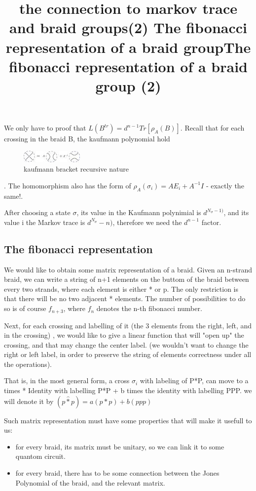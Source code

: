 \documentclass{article}
\begin{document}
{We only have to proof that \(L(B^{tr}) = d^{n-1}Tr[\rho_{A}(B)]\). Recall that for each crossing in the braid B, the kaufmann polynomial hold \begin{figure}
\includegraphics[scale=1]{kaufmann_bracket_identity} 
\caption{kaufmann bracket recursive nature}
\end{figure}.
The homomorphism also has the form of  \(\rho_{A}(\sigma_{i}) = AE_{i} +A^{-1}I\) - exactly the same!.

\title{the connection to markov trace and braid groups(2) }
After choosing a state \(\sigma\), its value in the Kaufmann polynimial is \(d^{N_{\sigma} -1)}\), and its
value i the Markov trace is \(d^{N_{\sigma}} -n )\), therefore we need the \(d^{n-1}\) factor. 
 

\subsection{The fibonacci representation}
\title{The fibonacci representation of a braid group}
We would like to obtain some matrix representation of a braid. Given an n-strand braid, we can write a string of n+1 elements on the buttom of the braid between every two strands, where each element is either * or p. The only restriction is that there will be no two adjacent * elements. The number of possibilities to do so is of course \(f_{n+3}\), where \(f_{n}\) denotes the n-th fibonacci number.

Next, for each crossing and labelling of it (the 3 elements from the right, left, and in the crossing) , we would like to give a linear function that will "open up" the crossing, and that may change the center label. (we wouldn't want to change the right or left label, in order to preserve the string of elements correctness under all the operations).
 

\title{The fibonacci representation of a braid group (2)}
That is, in the most general form, a cross \(\sigma_{i}\) with labeling of P*P, can move to 
a times * Identity with labelling P*P + b times the identity with labelling PPP.
we will denote it by \((p\hat{*}p)=a(p*p)+b(ppp)\)


Such matrix representation must have some properties that will make it usefull to us:
\begin{itemize}
\item for every braid, its matrix must be unitary, so we can link it to some quantom circuit.
\item for every braid, there has to be some connection between the Jones Polynomial of the braid, and the relevant matrix.
\end{itemize}
 


}
\end{document}
